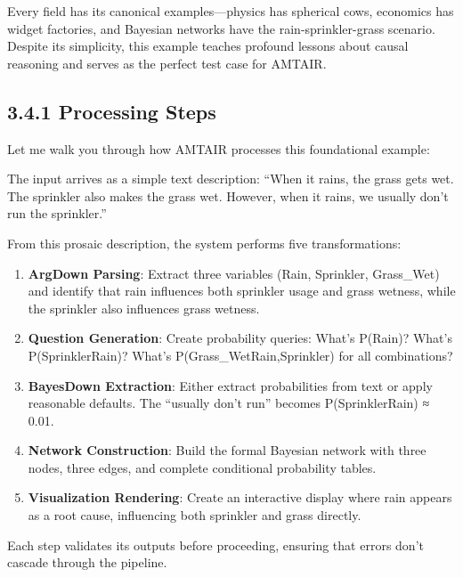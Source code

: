 \documentclass[
  11pt,
  letterpaper,
  openany]{book}
\providecommand{\tightlist}{%
  \setlength{\itemsep}{0pt}\setlength{\parskip}{0pt}}
\begin{document}
Every field has its canonical examples---physics has spherical cows,
economics has widget factories, and Bayesian networks have the
rain-sprinkler-grass scenario. Despite its simplicity, this example
teaches profound lessons about causal reasoning and serves as the
perfect test case for AMTAIR.

\subsection{3.4.1 Processing Steps}\label{sec-rsg-processing}

Let me walk you through how AMTAIR processes this foundational example:

The input arrives as a simple text description: ``When it rains, the
grass gets wet. The sprinkler also makes the grass wet. However, when it
rains, we usually don't run the sprinkler.''

From this prosaic description, the system performs five transformations:

\begin{enumerate}
\def\labelenumi{\arabic{enumi}.}
\tightlist
\item
  \textbf{ArgDown Parsing}: Extract three variables (Rain, Sprinkler,
  Grass\_Wet) and identify that rain influences both sprinkler usage and
  grass wetness, while the sprinkler also influences grass wetness.
\item
  \textbf{Question Generation}: Create probability queries: What's
  P(Rain)? What's P(Sprinkler\textbar Rain)? What's
  P(Grass\_Wet\textbar Rain,Sprinkler) for all combinations?
\item
  \textbf{BayesDown Extraction}: Either extract probabilities from text
  or apply reasonable defaults. The ``usually don't run'' becomes
  P(Sprinkler\textbar Rain) ≈ 0.01.
\item
  \textbf{Network Construction}: Build the formal Bayesian network with
  three nodes, three edges, and complete conditional probability tables.
\item
  \textbf{Visualization Rendering}: Create an interactive display where
  rain appears as a root cause, influencing both sprinkler and grass
  directly.
\end{enumerate}

Each step validates its outputs before proceeding, ensuring that errors
don't cascade through the pipeline.
\end{document}
